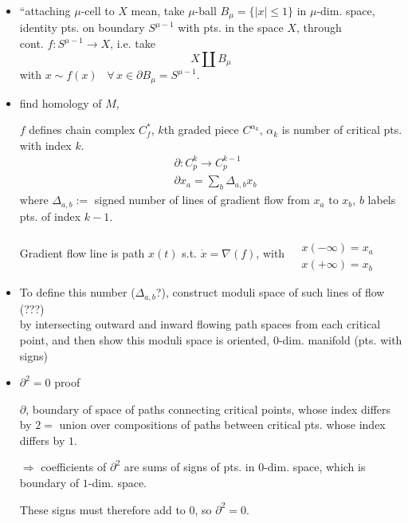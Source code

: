 \documentclass[10pt]{amsart}
\begin{document}
\begin{multicols*}{2}
\begin{itemize}
\item ``attaching $\mu$-cell to $X$ mean, take
  $\mu$-ball $B_{\mu} = \lbrace |x| \leq 1 \rbrace$ in $\mu$-dim. space, \\
  identity pts. on boundary $S^{\mu-1}$ with pts. in the space $X$, through \\
  cont. $f : S^{\mu-1} \to X$, i.e. take
  \[
X \coprod B_{\mu}
\]
with $x\sim f(x)$ \, $\forall \, x \in \partial B_{\mu} = S^{\mu -1}$.

 
\item find homology of $M$,
  
  $f$ defines chain complex $C_f^*$, $k$th graded piece $C^{\alpha_k}$, $\alpha_k$ is number of critical pts. with index $k$.
  \begin{equation}
\begin{aligned}
  & \partial : C_p^k \to C^{k-1}_p \\ 
  & \partial x_a = \sum_b \Delta_{a,b} x_b 
  \end{aligned}
    \end{equation}
  where $\Delta_{a,b} :=$ signed number of lines of gradient flow from $x_a$ to $x_b$, $b$ labels pts. of index $k-1$.

  Gradient flow line is path $x(t)$ s.t. $\dot{x} = \nabla (f)$, with $\begin{aligned} & \quad  \\
    & x(-\infty) = x_a \\
    & x(+\infty) = x_b \end{aligned}$

\item  To define this number ($\Delta_{a,b} $?), construct moduli space of such lines of flow (???) \\
  by intersecting outward and inward flowing path spaces from each critical point, and then show this moduli space is oriented, 0-dim. manifold (pts. with signs)

\item $\partial^2=0$ proof

  $\partial$, boundary of space of paths connecting critical points, whose index differs by $2 =$ union over compositions of paths between critical pts. whose index differs by $1$.

  $\Longrightarrow$ coefficients of $\partial^2$ are sums of signs of pts. in $0$-dim. space, which is boundary of $1$-dim. space.

  These signs must therefore add to $0$, so $\partial^2=0$.  
  

\end{itemize}
\end{multicols*}
\end{document}
